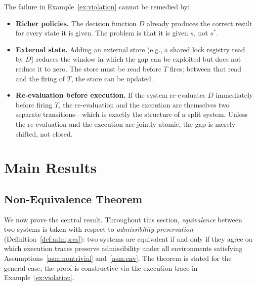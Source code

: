 \documentclass[11pt]{article}
\theoremstyle{plain}
\theoremstyle{definition}
\theoremstyle{remark}
\begin{document}
The failure in Example~\ref{ex:violation} cannot be remedied by:
\begin{itemize}
  \item \textbf{Richer policies.}  The decision function $D$ already
    produces the correct result for every state it is given.  The problem is
    that it is given $s$, not $s^*$.

  \item \textbf{External state.}  Adding an external store (e.g., a shared
    lock registry read by $D$) reduces the window in which the gap can be
    exploited but does not reduce it to zero.  The store must be read before
    $T$ fires; between that read and the firing of $T$, the store can be
    updated.

  \item \textbf{Re-evaluation before execution.}  If the system re-evaluates
    $D$ immediately before firing $T$, the re-evaluation and the execution are
    themselves two separate transitions---which is exactly the structure of a
    split system.  Unless the re-evaluation and the execution are jointly
    atomic, the gap is merely shifted, not closed.
\end{itemize}

\section{Main Results}
\label{sec:results}

\subsection{Non-Equivalence Theorem}

We now prove the central result.  Throughout this section,
\emph{equivalence} between two systems is taken with respect to
\emph{admissibility preservation} (Definition~\ref{def:admpres}): two systems
are equivalent if and only if they agree on which execution traces preserve
admissibility under all environments satisfying Assumptions~\ref{asm:nontrivial}
and~\ref{asm:env}.  The theorem is stated for the general case; the proof is
constructive via the execution trace in Example~\ref{ex:violation}.
\end{document}
